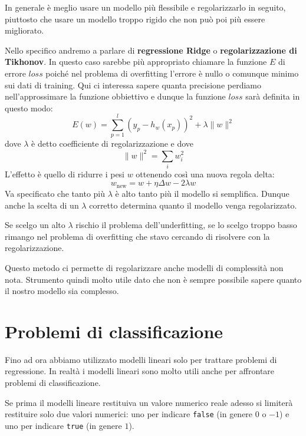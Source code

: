 In generale \`e meglio usare un modello pi\`u flessibile e regolarizzarlo in seguito, piuttosto che usare un modello
troppo rigido che non pu\`o poi pi\`u essere migliorato.

Nello specifico andremo a parlare di \textbf{regressione Ridge} o \textbf{regolarizzazione di Tikhonov}. In questo caso
sarebbe pi\`u appropriato chiamare la funzione $E$ di errore $loss$ poich\'e nel problema di overfitting l'errore \`e
nullo o comunque minimo sui dati di training. Qui ci interessa sapere quanta precisione perdiamo nell'approssimare la
funzione obbiettivo e dunque la funzione $loss$ sar\`a definita in questo modo:
\[ E(w) = \sum_{p = 1}^l (y_p - h_w(x_p))^2 + \lambda \| w \|^2 \]
dove $\lambda$ \`e detto coefficiente di regolarizzazione e dove
\[ \| w \|^2 = \sum_{i} w_i^2 \]
L'effetto \`e quello di ridurre i pesi $w$ ottenendo cos\`i una nuova regola delta:
\[ w_{\text{new}} = w + \eta \Delta w - 2 \lambda w \]
Va specificato che tanto pi\`u $\lambda$ \`e alto tanto pi\`u il modello si semplifica. Dunque anche la scelta di un
$\lambda$ corretto determina quanto il modello venga regolarizzato.

Se scelgo un alto $\lambda$ rischio il problema dell'underfitting, se lo scelgo troppo basso rimango nel problema di
overfitting che stavo cercando di risolvere con la regolarizzazione.

Questo metodo ci permette di regolarizzare anche modelli di complessit\`a non nota. Strumento quindi molto utile dato
che non \`e sempre possibile sapere quanto il nostro modello sia complesso.

\section{Problemi di classificazione}
Fino ad ora abbiamo utilizzato modelli lineari solo per trattare problemi di regressione. In realt\`a i modelli lineari
sono molto utili anche per affrontare problemi di classificazione.

Se prima il modelli lineare restituiva un valore numerico reale adesso si limiter\`a restituire solo due valori numerici:
uno per indicare \verb|false| (in genere $0$ o $-1$) e uno per indicare \verb|true| (in genere $1$).
